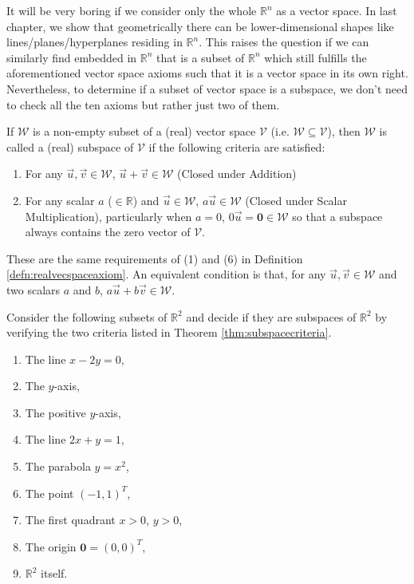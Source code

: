 It will be very boring if we consider only the whole $\mathbb{R}^n$ as a vector space. In last chapter, we show that geometrically there can be lower-dimensional shapes like lines/planes/hyperplanes residing in $\mathbb{R}^n$. This raises the question if we can similarly find  embedded in $\mathbb{R}^n$ that is a subset of $\mathbb{R}^n$ which still fulfills the aforementioned vector space axioms such that it is a vector space in its own right. Nevertheless, to determine if a subset of vector space is a subspace, we don't need to check all the ten axioms but rather just two of them.
\begin{thm}
\label{thm:subspacecriteria}
If $\mathcal{W}$ is a non-empty subset of a (real) vector space $\mathcal{V}$ (i.e. $\mathcal{W} \subseteq \mathcal{V}$), then $\mathcal{W}$ is called a (real) subspace of $\mathcal{V}$ if the following criteria are satisfied:
\begin{enumerate}
\item For any $\vec{u}, \vec{v} \in \mathcal{W}$, $\vec{u} + \vec{v} \in \mathcal{W}$ (Closed under Addition)
\item For any scalar $a$ ($\in \mathbb{R}$) and $\vec{u} \in \mathcal{W}$, $a\vec{u} \in \mathcal{W}$ (Closed under Scalar Multiplication), particularly when $a = 0$, $0\vec{u} = \textbf{0} \in \mathcal{W}$ so that a subspace always contains the zero vector of $\mathcal{V}$.
\end{enumerate}
These are the same requirements of (1) and (6) in Definition \ref{defn:realvecspaceaxiom}. An equivalent condition is that, for any $\vec{u}, \vec{v} \in \mathcal{W}$ and two scalars $a$ and $b$, $a\vec{u} + b\vec{v} \in \mathcal{W}$.
\end{thm}
\begin{exmp}
Consider the following subsets of $\mathbb{R}^2$ and decide if they are subspaces of $\mathbb{R}^2$ by verifying the two criteria listed in Theorem \ref{thm:subspacecriteria}.
\begin{enumerate}[label=(\alph*)]
\item The line $x - 2y = 0$,
\item The $y$-axis,
\item The positive $y$-axis,
\item The line $2x + y = 1$,
\item The parabola $y = x^2$,
\item The point $(-1,1)^T$,
\item The first quadrant $x > 0$, $y > 0$,
\item The origin $\textbf{0} = (0,0)^T$,
\item $\mathbb{R}^2$ itself.
\end{enumerate}
\end{exmp}
